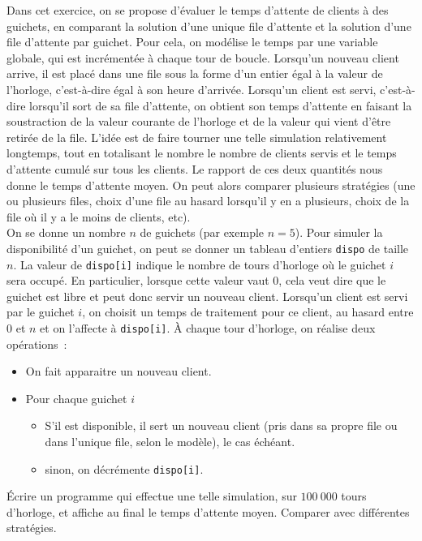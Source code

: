 \documentclass{magnolia}
\begin{document}
Dans cet exercice, on se propose d'évaluer le temps d'attente de clients à des guichets, en
comparant la solution d'une unique file d'attente et la solution d'une file d'attente par
guichet. Pour cela, on modélise le temps par une variable globale, qui est incrémentée
à chaque tour de boucle. Lorsqu'un nouveau client arrive, il est placé dans une file
sous la forme d'un entier égal à la valeur de l'horloge, c'est-à-dire égal à son heure
d'arrivée. Lorsqu'un client est servi, c'est-à-dire lorsqu'il sort de sa file d'attente, on
obtient son temps d'attente en faisant la soustraction de la valeur courante de l'horloge
et de la valeur qui vient d'être retirée de la file. L'idée est de faire tourner une telle
simulation relativement longtemps, tout en totalisant le nombre le nombre de clients servis
et le temps d'attente cumulé sur tous les clients. Le rapport de ces deux quantités nous
donne le temps d'attente moyen. On peut alors comparer plusieurs stratégies (une ou plusieurs
files, choix d'une file au hasard lorsqu'il y en a plusieurs, choix de la file où il y a le
moins de clients, etc).\\
On se donne un nombre $n$ de guichets (par exemple $n=5$). Pour simuler la disponibilité d'un
guichet, on peut se donner un tableau d'entiers \verb!dispo! de taille $n$. La valeur de
\verb!dispo[i]! indique le nombre de tours d'horloge où le guichet $i$ sera occupé. En
particulier, lorsque cette valeur vaut 0, cela veut dire que le guichet est libre et peut donc
servir un nouveau client. Lorsqu'un client est servi par le guichet $i$, on choisit un temps
de traitement pour ce client, au hasard entre 0 et $n$ et on l'affecte à \verb!dispo[i]!. À
chaque tour d'horloge, on réalise deux opérations~:
\begin{itemize}
\item On fait apparaitre un nouveau client.
\item Pour chaque guichet $i$
  \begin{itemize}
	\item S'il est disponible, il sert un nouveau client (pris dans sa propre file ou dans
	  l'unique file, selon le modèle), le cas échéant.
	\item sinon, on décrémente \verb!dispo[i]!.
	\end{itemize}
\end{itemize}
Écrire un programme qui effectue une telle simulation, sur $100\ 000$ tours d'horloge, et
affiche au final le temps d'attente moyen. Comparer avec différentes stratégies.
\end{document}
